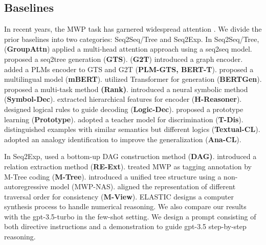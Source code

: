 \documentclass[11pt]{article}
\begin{document}
\subsection{Baselines} \label{baseline}
In recent years, the MWP task has garnered widespread attention \citep{zhou2023learning,xiong2022self,lan2022improving,yang2022unbiased,cobbe2021training,tsai2021sequence,huang2021recall}. We divide the prior baselines into two categories: Seq2Seq/Tree and Seq2Exp. In Seq2Seq/Tree, \citet{li-etal-2019-modeling} (\textbf{GroupAttn}) applied a multi-head attention approach using a seq2seq model. \citet{xie2019goal} proposed a seq2tree generation (\textbf{GTS}). \citet{zhang2020graph} (\textbf{G2T}) introduced a graph encoder. \citet{patel-etal-2021-nlp,liang2021mwp} added a PLMs encoder to GTS and G2T (\textbf{PLM-GTS, BERT-T}). \citet{tan2021investigating} proposed a multilingual model (\textbf{mBERT}). \citet{lan2021mwptoolkit} utilized Transformer for generation (\textbf{BERTGen}). \citet{shen-etal-2021-generate-rank} proposed a multi-task method \textbf{(Rank)}. \citet{qin-etal-2021-neural} introduced a neural symbolic method (\textbf{Symbol-Dec}). \citet{yu-etal-2021-improving} extracted hierarchical features for encoder (\textbf{H-Reasoner}). \citet{yang2022logicsolver} designed logical rules to guide decoding (\textbf{Logic-Dec}). \citet{li2021seeking} proposed a prototype learning (\textbf{Prototype}). \citet{ijcai2021-485} adopted a teacher model for discrimination (\textbf{T-Dis}). \citet{shen2022textual} distinguished examples with similar semantics but different logics (\textbf{Textual-CL}). \citet{liang-etal-2022-analogical} adopted an analogy identification to improve the generalization (\textbf{Ana-CL}). 

In Seq2Exp, \citet{cao2021bottom} used a bottom-up DAG construction method (\textbf{DAG)}. \citet{jie-etal-2022-learning} introduced a relation extraction method (\textbf{RE-Ext}). \citet{wang2022structure} treated MWP as tagging annotation by M-Tree coding (\textbf{M-Tree}). \citet{DBLP:journals/corr/abs-2305-04556} introduced a uniﬁed tree structure using a non-autoregressive model (MWP-NAS). \citet{zhang-etal-2022-multi-view} aligned the representation of different traversal order for consistency (\textbf{M-View}). ELASTIC \citep{zhang2022elastic} designs a computer synthesis process to handle numerical reasoning. We also compare our results with the gpt-3.5-turbo in the few-shot setting. We design a prompt consisting of both directive instructions and a demonstration to guide gpt-3.5 step-by-step reasoning. 
\end{document}
